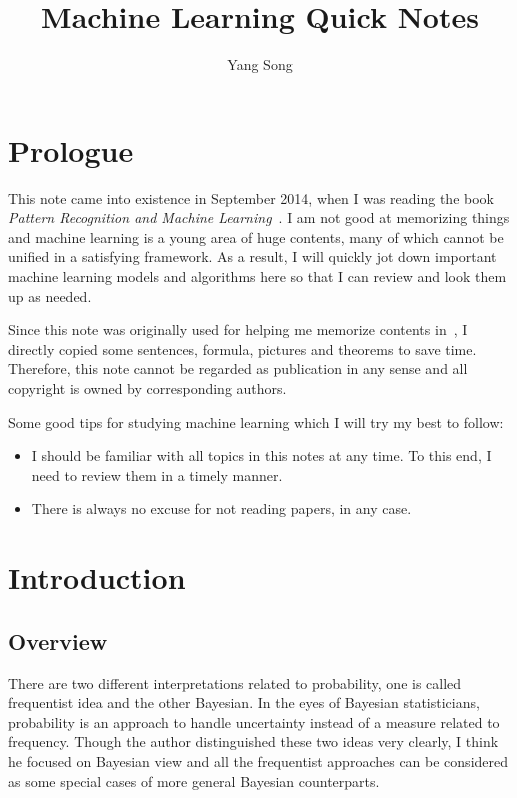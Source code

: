 \documentclass[a4paper]{book}
\title{Machine Learning Quick Notes}
\author{Yang Song}
\date{}
\begin{document}
\maketitle

\chapter*{Prologue}
This note came into existence in September 2014, when I was reading the book \textit{Pattern Recognition and Machine Learning}~\cite{bishop2007pattern}. I am not good at memorizing things and machine learning is a young area of huge contents, many of which cannot be unified in a satisfying framework. As a result, I will quickly jot down important machine learning models and algorithms here so that I can review and look them up as needed.

Since this note was originally used for helping me memorize contents in~\cite{bishop2007pattern}, I directly copied some sentences, formula, pictures and theorems to save time. Therefore, this note cannot be regarded as publication in any sense and all copyright is owned by corresponding authors.

Some good tips for studying machine learning which I will try my best to follow:
\begin{itemize}
	\item I should be familiar with all topics in this notes at any time. To this end, I need to review them in a timely manner.
	\item There is always no excuse for not reading papers, in any case.
\end{itemize}
\setcounter{tocdepth}{4}
\tableofcontents
\newpage
\chapter{Introduction}
\setcounter{page}{1}
\section{Overview}
There are two different interpretations related to probability, one is called frequentist idea and the other Bayesian. In the eyes of Bayesian statisticians, probability is an approach to handle uncertainty instead of a measure related to frequency. Though the author distinguished these two ideas very clearly, I think he focused on Bayesian view and all the frequentist approaches can be considered as some special cases of more general Bayesian counterparts.
\end{document}
